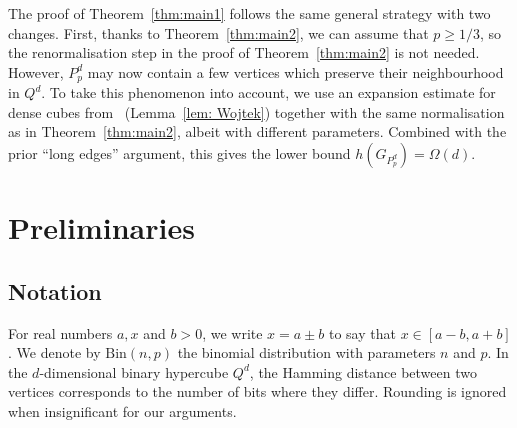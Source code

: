 \documentclass{article}
\theoremstyle{definition}
\begin{document}
The proof of Theorem~\ref{thm:main1} follows the same general strategy with two changes. 
First, thanks to Theorem~\ref{thm:main2}, we can assume that $p\geq 1/3$, so the renormalisation step in the proof of Theorem~\ref{thm:main2} is not needed.
However, $P^d_p$ may now contain a few vertices which preserve their neighbourhood in $Q^d$. 
To take this phenomenon into account, we use an expansion estimate for dense cubes from~\cite{FKSS26} (Lemma~\ref{lem: Wojtek}) together with the same normalisation as in Theorem~\ref{thm:main2}, albeit with different parameters. 
Combined with the prior ``long edges'' argument, this gives the lower bound $h(G_{P_p^d})=\Omega(d)$.







\section{Preliminaries}\label{sec: prelim}
\subsection{Notation}
For real numbers $a,x$ and $b>0$, we write $x=a\pm b$ to say that $x\in [a-b,a+b]$. We denote by $\mathrm{Bin}(n,p)$ the binomial distribution with parameters $n$ and $p$.
In the $d$-dimensional binary hypercube $Q^d$, the Hamming distance between two vertices corresponds to the number of bits where they differ.
Rounding is ignored when insignificant for our arguments.
\end{document}
